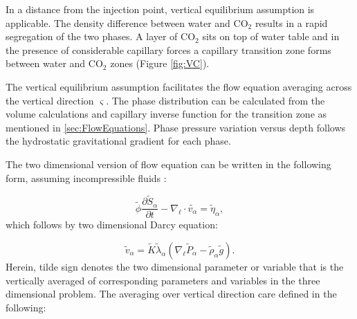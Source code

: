 In a distance from the injection point, vertical equilibrium assumption is
applicable. The density difference between water and $\mbox{CO}_2$ results in a
rapid
segregation of the two phases. A layer of $\mbox{CO}_2$ sits on top of water
table and in
the presence of considerable capillary forces a capillary transition zone forms
between water and $\mbox{CO}_2$ zones (Figure \ref{fig:VC}).

The vertical equilibrium assumption facilitates the flow equation averaging
across the vertical direction $\varsigma$. The phase distribution can be
calculated from the volume calculations and capillary inverse function for the
transition zone as mentioned in \ref{sec:FlowEquations}. Phase pressure
variation versus depth follows the hydrostatic gravitational gradient for each
phase.

The two dimensional version of flow equation can be written in the following
form, assuming incompressible fluids \cite{moll2011field,celia2011geological}:

\begin{equation}
 \tilde{\phi}\frac{\partial \tilde{S}_{\alpha}}{\partial
t}-\nabla_{\ell}\cdot \tilde{v_{\alpha}}=\tilde{\eta}_{\alpha},
\label{eq:cont_}
\end{equation} which follows by two dimensional Darcy equation:

\begin{equation}
\tilde{v}_{\alpha}=\tilde{K}\tilde{\lambda}_{\alpha}(\nabla_{\ell}
\tilde{P}_{\alpha}-\tilde{\rho}_{\alpha}\tilde{g}). 
\label{eq:Darcy_}
\end{equation}Herein, tilde sign denotes the two dimensional parameter or
variable that is the vertically averaged of corresponding parameters and
variables in the three dimensional problem. The averaging over vertical
direction care defined in the following:

